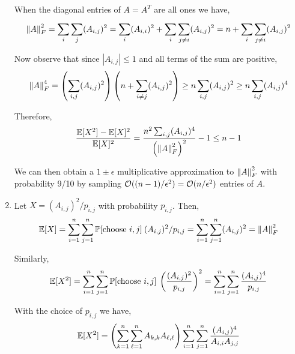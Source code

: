 \documentclass[10pt]{article}
\begin{document}
\begin{solution}[Solution]
\begin{enumerate}[label=(\alph*)]
        When the diagonal entries of \( A = A^T \) are all ones we have,
        \begin{align*}
            \left\lVert A\right\rVert_F^2 = \sum_{i}^{} \sum_{j}^{} (A_{i,j})^2
            = \sum_{i}^{} (A_{i,i})^2 + \sum_{i}^{} \sum_{j\neq i}^{} (A_{i,j})^2
            = n + \sum_{i}^{}\sum_{j\neq i}^{} (A_{i,j})^2
        \end{align*}
        
        Now observe that since \( |A_{i,j}| \leq 1 \) and all terms of the sum are positive, 
        \begin{align*}
            \left\lVert A\right\rVert_F^4 = \left( \sum_{i,j} (A_{i,j})^2 \right) \left( n + \sum_{i\neq j}^{} (A_{i,j})^2 \right)
            \geq n \sum_{i,j}^{} (A_{i,j})^2
            \geq n \sum_{i,j}^{} (A_{i,j})^4
        \end{align*}
        
        Therefore,
        \begin{align*}
            \frac{\mathbb{E}[X^2] - \mathbb{E}[X]^2}{\mathbb{E}[X]^2} 
            = \frac{n^2\sum_{i,j}^{}(A_{i,j})^4}{\left(\left\lVert A\right\rVert_F^2\right)^2} - 1
            \leq n-1
        \end{align*}
        

        We can then obtain a \( 1\pm \epsilon \) multiplicative approximation to \( \left\lVert A\right\rVert_F^2 \) with probability 9/10 by sampling \( \mathcal{O}((n-1)/\epsilon^2) = \mathcal{O}(n/\epsilon^2) \) entries of \( A \). 


    \item 
        Let \( X = (A_{i,j})^2/p_{i,j} \) with probability \( p_{i,j} \). Then,
        \begin{align*}
            \mathbb{E}[X] = \sum_{i=1}^{n} \sum_{j=1}^{n} \mathbb{P}[\text{choose }i,j] \: (A_{i,j})^2 / p_{i,j}
            = \sum_{i=1}^{n} \sum_{j=1}^{n} (A_{i,j})^2
            = \left\lVert A\right\rVert_F^2
        \end{align*}
        
        Similarly,
        \begin{align*}
            \mathbb{E}[X^2] = \sum_{i=1}^{n} \sum_{j=1}^{n} \mathbb{P}[\text{choose }i,j] \: \left(\frac{(A_{i,j})^2}{p_{i,j}}\right)^2 
            = \sum_{i=1}^{n} \sum_{j=1}^{n} \frac{(A_{i,j})^4}{p_{i,j}}
        \end{align*}

        With the choice of \( p_{i,j} \) we have,
        \begin{align*}
            \mathbb{E}[X^2] = 
            \left( \sum_{k=1}^{n} \sum_{\ell=1}^{n} A_{k,k}A_{\ell,\ell} \right)\sum_{i=1}^{n} \sum_{j=1}^{n} \frac{(A_{i,j})^4}{A_{i,i}A_{j,j}}
        \end{align*}
        


\end{enumerate}
\end{solution}
\end{document}
